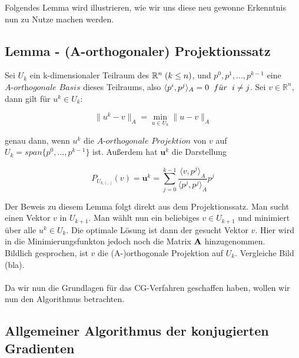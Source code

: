 Folgendes Lemma wird illustrieren, wie wir uns diese neu gewonne Erkenntnis nun zu Nutze machen werden.

\subsection{Lemma - (A-orthogonaler) Projektionssatz}\label{s.Projektionssatz}

Sei $U_{k}$ ein k-dimensionaler Teilraum des $\mathbb{R}^{n} \hspace{1mm} (k \le n)$, und $p^{0}, p^{1},...,p^{k-1}$ eine $\textit{A-orthogonale Basis}$ dieses Teilraums, also $\langle p^{i}, p^{j} \rangle _{A} = 0 \hspace{2mm} f\ddot{u}r \hspace{2mm} i \ne j$. Sei $v \in \mathbb{R}^{n}$, dann gilt für $u^{k} \in U_{k}$:

\begin{equation}
\|u^{k} - v\|_{A} = \underset{u \in U_{k}}{\min} \|u - v\|_{A}
\end{equation}

genau dann, wenn $u^{k}$ die $\textit{A-orthogonale Projektion}$ von $v$ auf $U_{k} = span\{p^{0},...,p^{k-1}\}$ ist. Außerdem hat $\textbf{u}^{k}$ die Darstellung

\begin{equation}
P_{U_{k,\langle \cdot,\cdot \rangle}}(v) = \textbf{u}^{k} = \sum_{j=0}^{k-1} \frac {\langle v, p^{j} \rangle _{A}} {\langle p^{j}, p^{j} \rangle _{A}} p^{j}
\end{equation}

Der Beweis zu diesem Lemma folgt direkt aus dem Projektionssatz. Man sucht einen Vektor $v$ in $U_{k+1}$. Man wählt nun ein beliebiges $v \in U_{k+1}$ und minimiert über alle $u^{k} \in U_{k}$. Die optimale Lösung ist dann der gesucht Vektor $v$. Hier wird in die Minimierungsfunkton jedoch noch die Matrix ${\textbf{A}}$ hinzugenommen. \\
Bildlich gesprochen, ist $v$ die (A-)orthogonale Projektion auf $U_{k}$. Vergleiche Bild (bla). \\ \\

Da wir nun die Grundlagen für das CG-Verfahren geschaffen haben, wollen wir nun den Algorithmus betrachten.

\subsection{Allgemeiner Algorithmus der konjugierten Gradienten}

